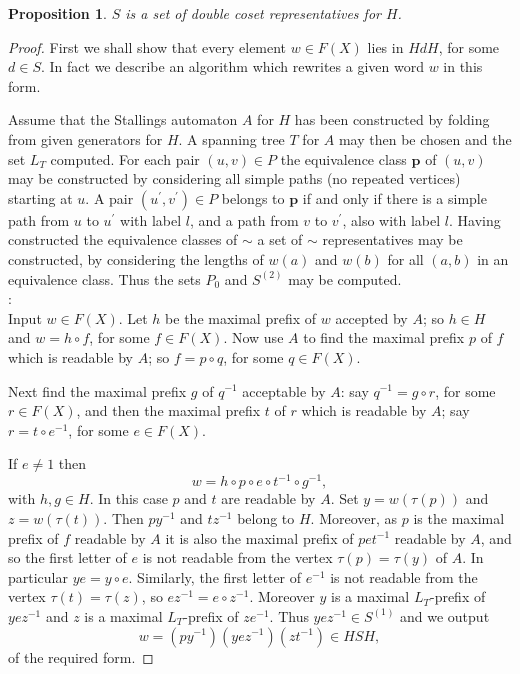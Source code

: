 \documentclass[a4paper,12pt]{article}
\renewcommand{\t}{\tau }
\newcommand{\pp}{\mathbf{p}}
\newtheorem{proposition}[theorem]{Proposition}
\numberwithin{equation}{section}
\numberwithin{figure}{section}
\begin{document}
\begin{proposition}\label{prop:dcreps}
$S$ is a set of double coset representatives for $H$.
\end{proposition}
\begin{proof}
First we shall show that every element $w\in F(X)$ lies in $HdH$,
for some $d\in S$. In fact we describe an algorithm which
rewrites a given word $w$ in this form.

Assume that the Stallings automaton $A$ for $H$ has been constructed by folding from
given generators for $H$. A spanning tree $T$
for $A$ may then be chosen and the
set $L_T$ computed. For each pair $(u,v)\in P$ the equivalence class $\pp$ of
$(u,v)$ may be constructed by considering all simple paths (no repeated vertices)
starting at $u$. A pair $(u^\prime ,v^\prime) \in P$ belongs to $\pp$
if and only
if there is a simple path from $u$ to $u^\prime$ with label $l$,
and a path from $v$ to $v^\prime$, also with label $l$.
Having constructed the equivalence classes of $\sim$
 a set of $\sim$ representatives may be constructed, by considering the
lengths of $w(a)$ and $w(b)$ for all $(a,b)$ in an equivalence class. Thus the
sets $P_0$ and $S^{(2)}$ may be computed.   \\

:\\
Input $w\in F(X)$.
Let $h$ be the maximal prefix of $w$ accepted by $A$; so $h\in H$ and
$w=h\circ f$, for some $f\in F(X)$. Now use $A$ to find the maximal prefix $p$
of $f$ which is readable by $A$;
 so $f= p\circ q$, for some $q\in F(X)$.

Next find the maximal prefix $g$ of $q^{-1}$ acceptable by $A$: say
$q^{-1}=g\circ r$, for some $r\in F(X)$, and then the maximal prefix
$t$ of $r$ which
is readable by $A$; say $r=t\circ e^{-1}$, for some $e\in F(X)$.

If $e\neq 1$ then
\[w=h\circ p \circ e\circ t^{-1}\circ g^{-1},\]
with $h,g\in H$. In this case $p$ and $t$ are readable by $A$. Set $y=w(\t(p))$
and $z=w(\t(t))$. Then $py^{-1}$ and $tz^{-1}$ belong to $H$. Moreover, as $p$
is the maximal prefix of $f$ readable by $A$  it is also the maximal
prefix of $pet^{-1}$ readable by $A$,  and so
  the
first letter of $e$ is not readable from the vertex $\t(p)=\t(y)$ of $A$.
In particular
$ye=y\circ e$. Similarly, the first letter of $e^{-1}$ is not readable from
the vertex $\t(t)=\t(z)$, so $ez^{-1}=e\circ z^{-1}$. Moreover $y$ is a
maximal $L_T$-prefix of $yez^{-1}$ and $z$ is a maximal $L_T$-prefix of $ze^{-1}$.
Thus $yez^{-1}\in S^{(1)}$ and we output
\[w=(py^{-1}) (yez^{-1})(zt^{-1})\in HSH,\]
of the required form.


\end{proof}
\end{document}
